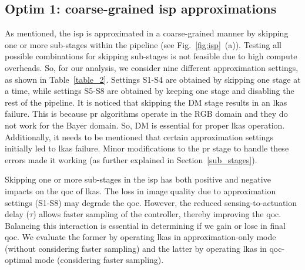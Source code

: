 \subsection{Optim 1: coarse-grained \gls{isp} approximations}\label{ss_optim_1}
As mentioned, the \gls{isp} is approximated in a coarse-grained manner by skipping one or more sub-stages within the pipeline (see Fig.\ \ref{fig:isp}~(a)). Testing all possible combinations for skipping sub-stages is not feasible due to high compute overheads. So, for our analysis, we consider nine different approximation settings, as shown in Table~\ref{table_2}. Settings S1-S4 are obtained by skipping one stage at a time, while settings S5-S8 are obtained by keeping one stage and disabling the rest of the pipeline. It is noticed that skipping the DM stage results in an \gls{lkas} failure. This is because \gls{pr} algorithms operate in the RGB domain and they do not work for the Bayer domain. So, DM is essential for proper \gls{lkas} operation. Additionally, it needs to be mentioned that certain approximation settings initially led to \gls{lkas} failure. Minor modifications to the \gls{pr} stage to handle these errors made it working (as further explained in Section~\ref{sub_stages}). 

\par Skipping one or more sub-stages in the \gls{isp} has both positive and negative impacts on the \gls{qoc} of \gls{lkas}. The loss in image quality due to approximation settings (S1-S8) may degrade the \gls{qoc}. However, the reduced sensing-to-actuation delay ($\tau$) allows faster sampling of the controller, thereby improving the \gls{qoc}. Balancing this interaction is essential in determining if we gain or lose in final \gls{qoc}. We evaluate the former by operating \gls{lkas} in approximation-only mode (without considering faster sampling) and the latter by operating \gls{lkas} in \gls{qoc}-optimal mode (considering faster sampling).

